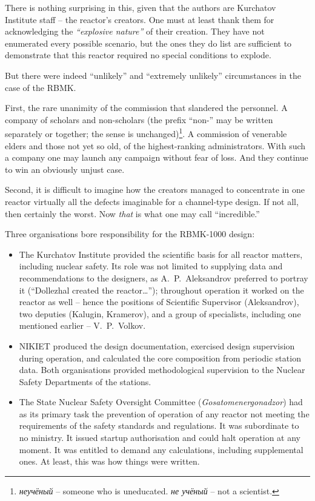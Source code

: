 \documentclass[openright]{bookest}
\begin{document}
There is nothing surprising in this, given that the authors are Kurchatov Institute staff -- the reactor's creators. One must at least thank them for acknowledging the \textit{``explosive nature''} of their creation. They have not enumerated every possible scenario, but the ones they do list are sufficient to demonstrate that this reactor required no special conditions to explode.

But there were indeed ``unlikely'' and ``extremely unlikely'' circumstances in the case of the RBMK.

First, the rare unanimity of the commission that slandered the personnel. A company of scholars and non-scholars (the prefix ``non-'' may be written separately or together; the sense is unchanged)\footnote{\textit{неучёный} -- someone who is uneducated. \textit{не учёный} -- not a scientist.}. A commission of venerable elders and those not yet so old, of the highest-ranking administrators. With such a company one may launch any campaign without fear of loss. And they continue to win an obviously unjust case.

Second, it is difficult to imagine how the creators managed to concentrate in one reactor virtually all the defects imaginable for a channel-type design. If not all, then certainly the worst. Now \textit{that} is what one may call ``incredible.''

Three organisations bore responsibility for the RBMK-1000 design:
\begin{itemize}
\item The Kurchatov Institute provided the scientific basis for all reactor matters, including nuclear safety. Its role was not limited to supplying data and recommendations to the designers, as A.~P.~Aleksandrov preferred to portray it (``Dollezhal created the reactor\ldots''); throughout operation it worked on the reactor as well -- hence the positions of Scientific Supervisor (Aleksandrov), two deputies (Kalugin, Kramerov), and a group of specialists, including one mentioned earlier -- V.~P.~Volkov.
\item NIKIET produced the design documentation, exercised design supervision during operation, and calculated the core composition from periodic station data. Both organisations provided methodological supervision to the Nuclear Safety Departments of the stations.
\item The State Nuclear Safety Oversight Committee (\textit{Gosatomenergonadzor}) had as its primary task the prevention of operation of any reactor not meeting the requirements of the safety standards and regulations. It was subordinate to no ministry. It issued startup authorisation and could halt operation at any moment. It was entitled to demand any calculations, including supplemental ones. At least, this was how things were written.
\end{itemize}
\end{document}
